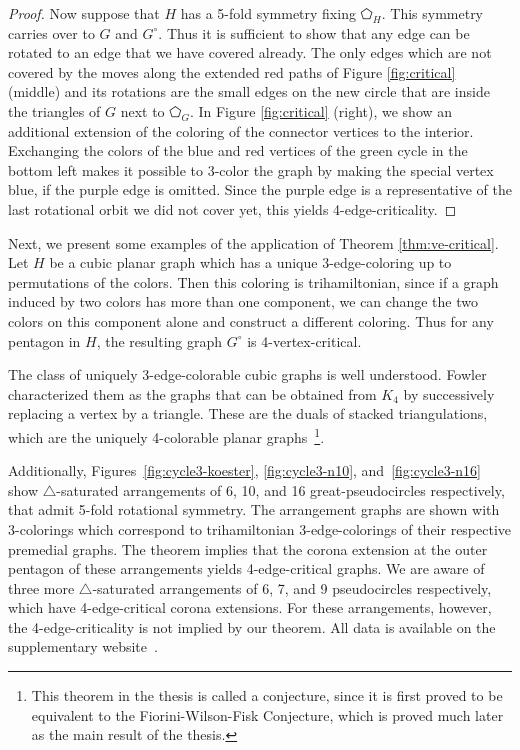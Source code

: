 \documentclass[fontsize=11pt,a4paper,DIV12]{scrartcl}
\def\GC{\ensuremath{G^\circ}}
\begin{document}
\begin{proof}
  Now suppose that $H$ has a 5-fold symmetry fixing $\pentagon_H$. This symmetry carries over to $G$ and $\GC$. Thus it is sufficient to show that any edge can be rotated to an edge that we have covered already. The only edges which are not covered by the moves along the extended red paths of Figure \ref{fig:critical} (middle) and its rotations are the small edges on the new circle that are inside the triangles of $G$ next to $\pentagon_G$. In Figure \ref{fig:critical} (right), we show an additional extension of the coloring of the connector vertices to the interior. Exchanging the colors of the blue and red vertices of the green cycle in the bottom left makes it possible to 3-color the graph by making the special vertex blue, if the purple edge is omitted. Since the purple edge is a representative of the last rotational orbit we did not cover yet, this yields 4-edge-criticality.
\end{proof}

Next, we present some examples of the application of Theorem \ref{thm:ve-critical}. Let $H$ be a cubic planar
graph which has a unique 3-edge-coloring up to permutations of the colors. Then this coloring is 
trihamiltonian, since if a graph induced by two colors has more than one component, we can change the two colors on this component alone and construct a different coloring. Thus for any pentagon in $H$, the resulting graph $\GC$ is 4-vertex-critical.

The class of uniquely 3-edge-colorable cubic graphs is well understood.
Fowler~\cite[Theorem 2.8.5]{FowlerPHD} characterized them as the graphs that can be obtained from
$K_4$ by successively replacing a vertex by a triangle. These are the duals of stacked triangulations, 
which are the uniquely 4-colorable planar graphs~\cite[Conjecture 1.2.1]{FowlerPHD}\footnote{This theorem in the thesis is called a conjecture, since it is first proved to be equivalent to the Fiorini-Wilson-Fisk Conjecture, which is proved much later as the main result of the thesis.}.


Additionally, Figures~\ref{fig:cycle3-koester}, \ref{fig:cycle3-n10},
and~\ref{fig:cycle3-n16} show $\triangle$-saturated arrangements of 6, 10, and 16 great-pseudocircles respectively, that admit 5-fold rotational symmetry. The arrangement graphs are shown with 3-colorings which correspond to trihamiltonian 3-edge-colorings of their respective premedial graphs. The theorem implies that the corona extension at the outer pentagon of these arrangements yields 4-edge-critical graphs. We are aware of three more \mbox{$\triangle$-saturated} arrangements of 6, 7, and 9 pseudocircles respectively, which have 4-edge-critical corona extensions. For these arrangements, however, the 4-edge-criticality is not implied by our theorem.
 All data is available on the supplementary website~\cite{pseudocircles_website}.
\end{document}
